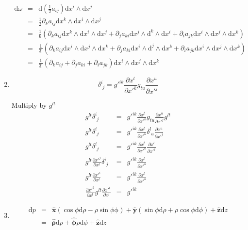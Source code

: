 \documentclass[12pt,a4paper]{article}
\begin{document}
\begin{enumerate}
\begin{eqnarray*}
	\mathrm d\omega &=& \mathrm d (\frac 12 a_{ij}) \mathrm dx^i\wedge\mathrm dx^j \\
	&=& \frac{1}{2}\partial_k a_{ij} \mathrm dx^k \wedge \mathrm dx^i \wedge \mathrm dx^j \\
	&=& \frac 1 6 (\partial_k a_{ij}\mathrm dx^k\wedge\mathrm dx^i\wedge\mathrm dx^j + \partial_j a_{ki}\mathrm dx^j\wedge\mathrm d^k\wedge\mathrm dx^i + \partial_i a_{jk}\mathrm dx^i\wedge\mathrm dx^j\wedge\mathrm dx^k) \\
	&=& \frac 1{3!}(\partial_k a_{ij}\mathrm dx^i\wedge\mathrm dx^j\wedge\mathrm dx^k + \partial_j a_{ki}\mathrm dx^i\wedge\mathrm d^j\wedge\mathrm dx^k + \partial_i a_{jk}\mathrm dx^i\wedge\mathrm dx^j\wedge\mathrm dx^k) \\
	&=& \frac 1{3!}(\partial_k a_{ij} + \partial_j a_{ki} + \partial_i a_{jk})\mathrm dx^i\wedge\mathrm dx^j\wedge\mathrm dx^k
\end{eqnarray*}


\item

\begin{equation}
	\delta^i_{\phantom ij} = g'^{ik} \frac{\partial x^t}{\partial x'^k} g_{tu}\frac{\partial x^u}{\partial x'^{j}}
\end{equation}

Multiply by $g^{lt}$
\begin{eqnarray*}
	g^{lt} \delta^i_{\phantom ij} &=& g'^{ik} \frac{\partial x^t}{\partial x'^k} g_{tu}\frac{\partial x^u}{\partial x'^{j}}g^{lt} \\
	g^{lt} \delta^i_{\phantom ij} &=& g'^{ik} \frac{\partial x^t}{\partial x'^k} \delta^l_{\phantom l u}\frac{\partial x^u}{\partial x'^{j}} \\
	g^{lt}\delta^i_{\phantom ij} &=& g'^{ik} \frac{\partial x^t}{\partial x'^k} \frac{\partial x^l}{\partial x'^{j}} \\
	g^{lt} \frac{\partial x'^{j}}{\partial x^l} \delta^i_{\phantom ij}&=& g'^{ik} \frac{\partial x^t}{\partial x'^k}\\
	g^{lt} \frac{\partial x'^{i}}{\partial x^l}&=& g'^{ik} \frac{\partial x^t}{\partial x'^k} \\
		 \frac{\partial x'^k}{\partial x^t} g^{lt} \frac{\partial x'^{i}}{\partial x^l}&=& g'^{ik}
\end{eqnarray*}





\item
\begin{eqnarray*}
	\mathrm dp &=& \bm{\hat x}( \cos\phi\mathrm d\rho -\rho\sin\phi\mathrm \phi ) + \bm{\hat y} (\sin\phi\mathrm d \rho + \rho\cos\phi\mathrm d\phi) + \bm {\hat z} \mathrm d z \\
	&=& \bm{\hat \rho} \mathrm d\rho + \bm{\hat \phi} \rho \mathrm d \phi + \bm{\hat z} \mathrm dz
\end{eqnarray*}


\end{enumerate}
\end{document}
